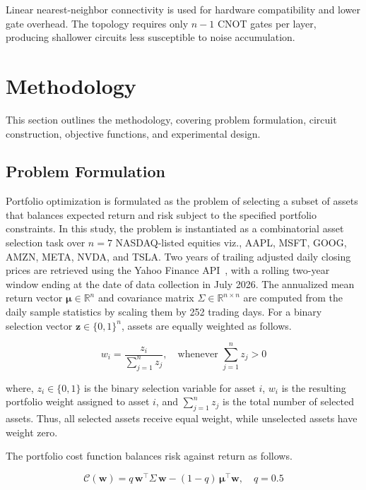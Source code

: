 \documentclass[runningheads]{llncs}
\begin{document}
Linear nearest-neighbor connectivity is used for hardware compatibility and lower gate overhead. The topology requires only $n-1$ CNOT gates per layer, producing shallower circuits less susceptible to noise accumulation.
\section{Methodology} \label{methodology}
This section outlines the methodology, covering problem formulation, circuit construction, objective functions, and experimental design.
\subsection{Problem Formulation}

Portfolio optimization is formulated as the problem of selecting a subset of assets that balances expected return and risk subject to the specified portfolio constraints. In this study, the problem is instantiated as a combinatorial asset selection task over $n = 7$ NASDAQ-listed equities viz., AAPL, MSFT, GOOG, AMZN, META, NVDA, and TSLA. Two years of trailing adjusted daily closing prices are retrieved using the Yahoo Finance API~\cite{yfinance}, with a rolling two-year window ending at the date of data collection in July 2026. The annualized mean return vector $\boldsymbol{\mu} \in \mathbb{R}^n$ and covariance matrix $\Sigma \in \mathbb{R}^{n \times n}$ are computed from the daily sample statistics by scaling them by 252 trading days. For a binary selection vector $\mathbf{z} \in \{0,1\}^n$, assets are equally weighted as follows.

\begin{equation} 
w_i = \frac{z_i}{\sum_{j=1}^{n} z_j}, \quad 
\text{whenever } \sum_{j=1}^{n} z_j > 0 
\end{equation}

where, $z_i \in \{0,1\}$ is the binary selection variable for asset $i$, $w_i$ is the resulting portfolio weight assigned to asset $i$, and $\sum_{j=1}^{n}z_j$ is the total number of selected assets. Thus, all selected assets receive equal weight, while unselected assets have weight zero.

The portfolio cost function balances risk against return as follows.

\begin{equation}
    \mathcal{C}(\mathbf{w}) = q\,\mathbf{w}^\top 
    \Sigma\,\mathbf{w} - (1-q)\,\boldsymbol{\mu}^\top 
    \mathbf{w}, \quad q = 0.5
\end{equation}
\end{document}
